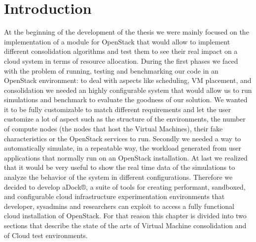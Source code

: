

\section{Introduction}
\label{sec:sota_intro}
At the beginning of the development of the thesis we were mainly focused on the implementation of a module for OpenStack that would allow to implement different consolidation algorithms and test them to see their real impact on a cloud system in terms of resource allocation. During the first phases we faced with the problem of running, testing and benchmarking our code in an OpenStack environment: to deal with aspects like scheduling, VM placement, and consolidation we needed an highly configurable system that would allow us to run simulations and benchmark to evaluate the goodness of our solution. We wanted it to be fully customizable to match different requirements and let the user customize a lot of aspect such as the structure of the environments, the number of compute nodes (the nodes that host the Virtual Machines), their fake characteristics or the OpenStack services to run. Secondly we needed a way to automatically simulate, in a repeatable way, the workload generated from user applications that normally run on an OpenStack installation. At last we realized that it would be very useful to show the real time data of the simulations to analyze the behavior of the system in different configurations.
Therefore we decided to develop aDock®, a suite of tools for creating performant, sandboxed, and configurable cloud infrastructure experimentation environments that developer, sysadmins and researchers can exploit to access a fully functional cloud installation of OpenStack.
For that reason this chapter is divided into two sections that describe the state of the arts of Virtual Machine consolidation and of Cloud test environments.

